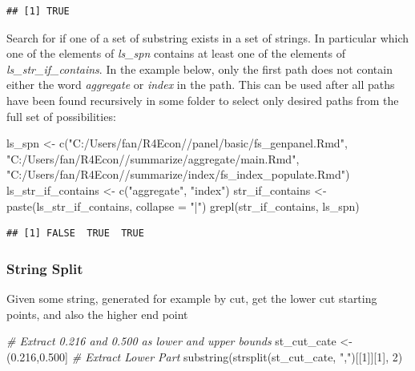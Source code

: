 \documentclass[
]{book}
\newenvironment{Shaded}{\begin{snugshade}}{\end{snugshade}}
\newcommand{\AttributeTok}[1]{\textcolor[rgb]{0.77,0.63,0.00}{#1}}
\newcommand{\CommentTok}[1]{\textcolor[rgb]{0.56,0.35,0.01}{\textit{#1}}}
\newcommand{\DecValTok}[1]{\textcolor[rgb]{0.00,0.00,0.81}{#1}}
\newcommand{\FunctionTok}[1]{\textcolor[rgb]{0.00,0.00,0.00}{#1}}
\newcommand{\NormalTok}[1]{#1}
\newcommand{\OtherTok}[1]{\textcolor[rgb]{0.56,0.35,0.01}{#1}}
\newcommand{\StringTok}[1]{\textcolor[rgb]{0.31,0.60,0.02}{#1}}
\begin{document}
\begin{verbatim}
## [1] TRUE
\end{verbatim}

Search for if one of a set of substring exists in a set of strings. In particular which one of the elements of \emph{ls\_spn} contains at least one of the elements of \emph{ls\_str\_if\_contains}. In the example below, only the first path does not contain either the word \emph{aggregate} or \emph{index} in the path. This can be used after all paths have been found recursively in some folder to select only desired paths from the full set of possibilities:

\begin{Shaded}
\begin{Highlighting}[]
\NormalTok{ls\_spn }\OtherTok{\textless{}{-}} \FunctionTok{c}\NormalTok{(}\StringTok{"C:/Users/fan/R4Econ//panel/basic/fs\_genpanel.Rmd"}\NormalTok{,}
            \StringTok{"C:/Users/fan/R4Econ//summarize/aggregate/main.Rmd"}\NormalTok{,}
            \StringTok{"C:/Users/fan/R4Econ//summarize/index/fs\_index\_populate.Rmd"}\NormalTok{)}
\NormalTok{ls\_str\_if\_contains }\OtherTok{\textless{}{-}} \FunctionTok{c}\NormalTok{(}\StringTok{"aggregate"}\NormalTok{, }\StringTok{"index"}\NormalTok{)}
\NormalTok{str\_if\_contains }\OtherTok{\textless{}{-}} \FunctionTok{paste}\NormalTok{(ls\_str\_if\_contains, }\AttributeTok{collapse =} \StringTok{"|"}\NormalTok{)}
\FunctionTok{grepl}\NormalTok{(str\_if\_contains, ls\_spn)}
\end{Highlighting}
\end{Shaded}

\begin{verbatim}
## [1] FALSE  TRUE  TRUE
\end{verbatim}

\hypertarget{string-split}{%
\subsubsection{String Split}\label{string-split}}

Given some string, generated for example by cut, get the lower cut starting points, and also the higher end point

\begin{Shaded}
\begin{Highlighting}[]
\CommentTok{\# Extract 0.216 and 0.500 as lower and upper bounds}
\NormalTok{st\_cut\_cate }\OtherTok{\textless{}{-}} \StringTok{\textquotesingle{}(0.216,0.500]\textquotesingle{}}
\CommentTok{\# Extract Lower Part}
\FunctionTok{substring}\NormalTok{(}\FunctionTok{strsplit}\NormalTok{(st\_cut\_cate, }\StringTok{","}\NormalTok{)[[}\DecValTok{1}\NormalTok{]][}\DecValTok{1}\NormalTok{], }\DecValTok{2}\NormalTok{)}
\end{Highlighting}
\end{Shaded}
\end{document}

